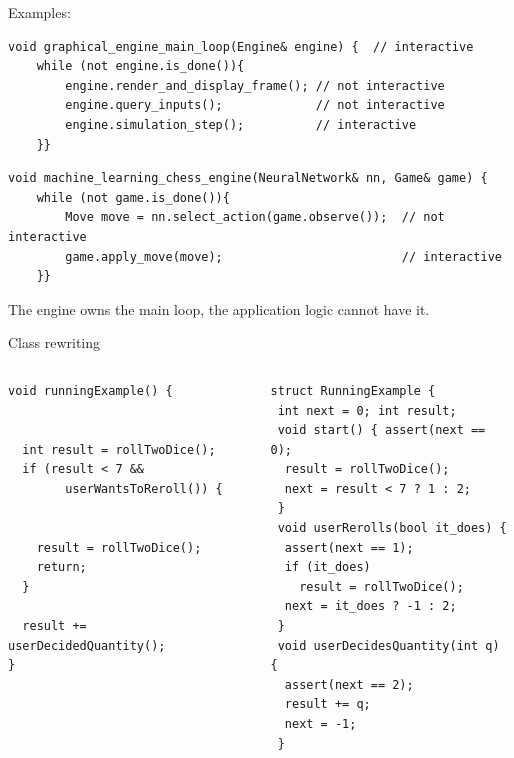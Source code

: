 \documentclass[aspectratio=169,11pt]{beamer}
\begin{document}
\begin{frame}[fragile]{Examples:}

\begin{lstlisting}[style=cppstyle]
void graphical_engine_main_loop(Engine& engine) {  // interactive
    while (not engine.is_done()){
        engine.render_and_display_frame(); // not interactive
        engine.query_inputs();             // not interactive
        engine.simulation_step();          // interactive
    }}
\end{lstlisting}

\begin{lstlisting}[style=cppstyle]
void machine_learning_chess_engine(NeuralNetwork& nn, Game& game) {  
    while (not game.is_done()){
        Move move = nn.select_action(game.observe());  // not interactive
        game.apply_move(move);                         // interactive 
    }}
\end{lstlisting}
The engine owns the main loop, the application logic cannot have it.
\end{frame}

\begin{frame}{Class rewriting}
  \begin{columns}[T,onlytextwidth]
\begin{column}{0.50\textwidth}
\begin{lstlisting}[style=cppstyle,numbers=none]
void runningExample() {


  int result = rollTwoDice();
  if (result < 7 && 
        userWantsToReroll()) { 


    result = rollTwoDice();
    return;
  }

  result += userDecidedQuantity(); 
}
\end{lstlisting}
\end{column}
    \begin{column}{0.48\textwidth}
\begin{lstlisting}[style=cppstyle,numbers=none]
struct RunningExample {
 int next = 0; int result;
 void start() { assert(next == 0);
  result = rollTwoDice();
  next = result < 7 ? 1 : 2;
 }
 void userRerolls(bool it_does) { 
  assert(next == 1);
  if (it_does)
    result = rollTwoDice();
  next = it_does ? -1 : 2;
 }
 void userDecidesQuantity(int q) { 
  assert(next == 2);
  result += q;
  next = -1;
 }
\end{lstlisting}
\end{column}
\end{columns}

\end{frame}
\end{document}
